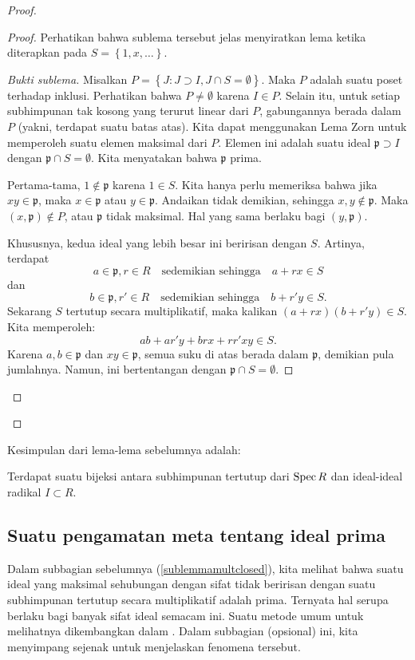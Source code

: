 \begin{proof}
\begin{proof}
Perhatikan bahwa sublema tersebut jelas menyiratkan lema ketika diterapkan pada
$S =
\left\{1, x, \dots\right\}.$

\begin{proof}[Bukti sublema]
Misalkan $P = \left\{J: J \supset I, J \cap S = \emptyset \right\}$.
Maka $P$ adalah suatu
poset terhadap inklusi. Perhatikan bahwa $P \neq \emptyset$
karena $I \in P$. Selain itu,
untuk setiap subhimpunan tak kosong yang terurut linear dari $P$, gabungannya berada dalam
$P$ (yakni, terdapat suatu
batas atas).  
Kita dapat menggunakan Lema Zorn untuk memperoleh suatu elemen maksimal dari $P$. Elemen ini
adalah suatu
ideal $\mathfrak{p} \supset I$ dengan $\mathfrak{p} \cap S =
\emptyset$. Kita menyatakan
bahwa $\mathfrak{p}$ prima.

Pertama-tama, $1 \notin \mathfrak{p}$ karena $1 \in S$. Kita hanya perlu
memeriksa
bahwa jika $xy \in \mathfrak{p}$, maka $x \in \mathfrak{p}$ atau $y
\in
\mathfrak{p}$. Andaikan tidak demikian, sehingga $x,y \notin \mathfrak{p}$.
Maka $(x,\mathfrak{p}) \notin P$, atau
$\mathfrak{p}$ tidak maksimal. Hal yang sama berlaku bagi $(y,
\mathfrak{p})$.

Khususnya, kedua ideal yang lebih besar ini beririsan dengan
$S$. Artinya,
terdapat 
\[ a \in \mathfrak{p} , r \in R \quad \text{sedemikian sehingga}\quad a+rx
\in S \]
dan 
\[ b \in \mathfrak{p} , r' \in R \quad \text{sedemikian sehingga}\quad
b+r'y \in S .\]
Sekarang $S$ tertutup secara multiplikatif, maka kalikan $(a+rx)(b+r'y)
\in S$.
Kita memperoleh:
\[ ab + ar'y+brx+rr'xy \in S.  \]
Karena $a,b \in \mathfrak{p}$ dan $xy \in \mathfrak{p}$, semua
suku di atas berada dalam $\mathfrak{p}$, demikian pula jumlahnya. Namun, ini bertentangan dengan
$\mathfrak{p}
\cap S = \emptyset$. 
\end{proof}
\end{proof} 
\end{proof} 
Kesimpulan dari lema-lema sebelumnya adalah:
\begin{proposition}
Terdapat suatu bijeksi antara subhimpunan tertutup dari $\operatorname{Spec} R$ dan
ideal-ideal radikal
$I \subset R$.
\end{proposition}

\subsection{Suatu pengamatan meta tentang ideal prima}

Dalam subbagian sebelumnya (\cref{sublemmamultclosed}), kita melihat
bahwa suatu ideal yang maksimal sehubungan dengan sifat tidak beririsan dengan suatu
subhimpunan tertutup secara multiplikatif adalah prima.
Ternyata hal serupa berlaku bagi banyak sifat ideal semacam ini.
Suatu metode umum untuk melihatnya dikembangkan dalam \cite{LaRe08}.
Dalam subbagian (opsional) ini, kita menyimpang sejenak untuk menjelaskan fenomena tersebut.

